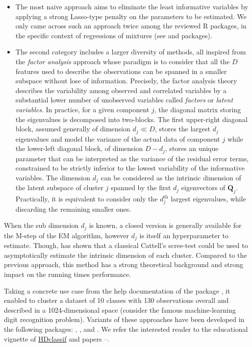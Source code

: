 \begin{itemize}
\item
  The most naive approach aims to eliminate the least informative variables by applying a strong Lasso-type penalty on the parameters to be estimated. We only came across such an approach twice among the reviewed R packages, in the specific context of regressions of mixtures (see and  packages).
\item
  The second category includes a larger diversity of methods, all inspired from the \emph{factor analysis} approach whose paradigm is to consider that all the \(D\) features used to describe the observations can be spanned in a smaller subspace without lose of information. Precisely, the factor analysis theory describes the variability among observed and correlated variables by a substantial lower number of unobserved variables called \emph{factors} or \emph{latent variables}.
  In practice, for a given component \(j\), the diagonal matrix storing the eigenvalues is decomposed into two-blocks. The first upper-right diagonal block, assumed generally of dimension \(d_j \ll D\), stores the largest \(d_j\) eigenvalues and model the variance of the actual data of component \(j\) while the lower-left diagonal block, of dimension \(D-d_j\), stores an unique parameter that can be interpreted as the variance of the residual error terms, constrained to be strictly inferior to the lowest variability of the informative variables. The dimension \(d_j\) can be considered as the intrinsic dimension of the latent subspace of cluster \(j\) spanned by the first \(d_j\) eigenvectors of \(\boldsymbol{Q}_j\). Practically, it is equivalent to consider only the \(d_j^\text{th}\) largest eigenvalues, while discarding the remaining smaller ones.
\end{itemize}

When the sub dimension \(d_j\) is known, a closed version is generally available for the M-step of the EM algorithm, however \(d_j\) is itself an hyperparameter to estimate. Though, \autocite{bouveyron_etal11} has shown that a classical Cattell's scree-test could be used to asymptotically estimate the intrinsic dimension of each cluster. Compared to the previous approach, this method has a strong theoretical background and strong impact on the running times performance.

Taking a concrete use case from the help documentation of the package , it enabled to cluster a dataset of 10 classes with 130 observations overall and described in a 1024-dimensional space (consider the famous machine-learning digit recognition problem). Variants of these approaches have been developed in the following packages: , ,  and . We refer the interested reader to the educational vignette of  \href{https://rdrr.io/pkg/HDclassif/man/HDclassif-package.html}{HDclassif} and papers \autocite{mcnicholas_murphy08}--\autocite{mcnicholas_murphy10}.

